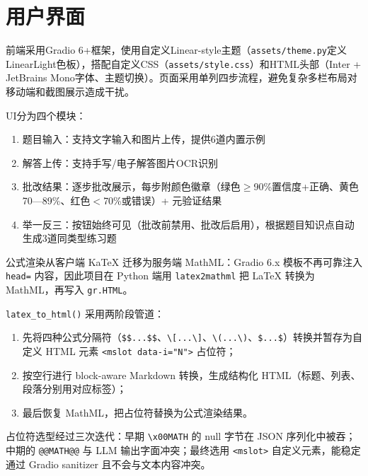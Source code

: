 \documentclass[12pt,a4paper]{ctexart}
\begin{document}
\section{用户界面}

前端采用Gradio 6+框架，使用自定义Linear-style主题（\verb|assets/theme.py|定义LinearLight色板），搭配自定义CSS（\verb|assets/style.css|）和HTML头部（Inter + JetBrains Mono字体、主题切换）。页面采用单列四步流程，避免复杂多栏布局对移动端和截图展示造成干扰。

UI分为四个模块：

\begin{enumerate}[nosep]
  \item 题目输入：支持文字输入和图片上传，提供6道内置示例
  \item 解答上传：支持手写/电子解答图片OCR识别
  \item 批改结果：逐步批改展示，每步附颜色徽章（绿色$\geq$90\%置信度+正确、黄色70—89\%、红色$<$70\%或错误）+ 元验证结果
  \item 举一反三：按钮始终可见（批改前禁用、批改后启用），根据题目知识点自动生成3道同类型练习题
\end{enumerate}

公式渲染从客户端 KaTeX 迁移为服务端 MathML：Gradio 6.x 模板不再可靠注入 \texttt{head=} 内容，因此项目在 Python 端用 \texttt{latex2mathml} 把 LaTeX 转换为 MathML，再写入 \texttt{gr.HTML}。

\texttt{latex\_to\_html()} 采用两阶段管道：

\begin{enumerate}[nosep]
  \item 先将四种公式分隔符（\texttt{\$\$...\$\$}、\texttt{\textbackslash[...\textbackslash]}、\texttt{\textbackslash(...\textbackslash)}、\texttt{\$...\$}）转换并暂存为自定义 HTML 元素 \texttt{<mslot data-i="N">} 占位符；
  \item 按空行进行 block-aware Markdown 转换，生成结构化 HTML（标题、列表、段落分别用对应标签）；
  \item 最后恢复 MathML，把占位符替换为公式渲染结果。
\end{enumerate}

占位符选型经过三次迭代：早期 \texttt{\textbackslash x00MATH} 的 null 字节在 JSON 序列化中被吞；中期的 \texttt{@@MATH@@} 与 LLM 输出字面冲突；最终选用 \texttt{<mslot>} 自定义元素，能稳定通过 Gradio sanitizer 且不会与文本内容冲突。
\end{document}
